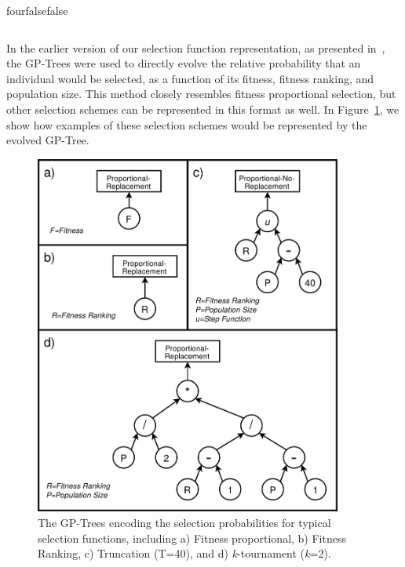 \documentclass[times,12pt,titlepage]{mstogs}
\begin{document}
\begin{ThesisAppendix}{four}{false}{false}
\begin{table}
\begin{tabular}{cp{5cm}p{5cm}}
	\bottomrule      
\end{tabular}
\end{table}




\label{apx:originalEppseaRepresentation}

In the earlier version of our selection function representation, as presented in~\citep{richter2018adpsea}, the GP-Trees were used to directly evolve the relative probability that an individual would be selected, as a function of its fitness, fitness ranking, and population size. This method closely resembles fitness proportional selection, but other selection schemes can be represented in this format as well. In Figure~\ref{fig:old_eppsea_representation}, we show how examples of these selection schemes would be represented by the evolved GP-Tree.

\begin{figure}
    \centering
    \includegraphics[width=0.9\textwidth]{old_eppsea_representation}
    \caption{The GP-Trees encoding the selection probabilities for typical selection functions, including a) Fitness proportional, b) Fitness Ranking, c) Truncation (T=40), and d) \textit{k}-tournament (\textit{k}=2).}
    \label{fig:old_eppsea_representation}
\end{figure}


\end{ThesisAppendix}
\end{document}

